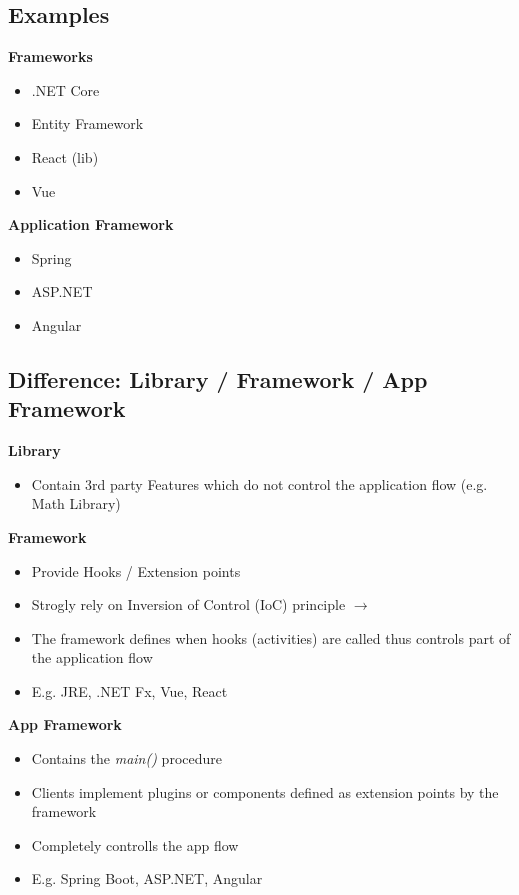 \subsection{Examples}
\textbf{Frameworks}
\begin{itemize}[topsep=0pt]
    \itemsep -0.4em
    \item .NET Core
    \item Entity Framework
    \item React (lib)
    \item Vue
\end{itemize}
\textbf{Application Framework}
\begin{itemize}[topsep=0pt]
    \itemsep -0.4em
    \item Spring
    \item ASP.NET
    \item Angular
\end{itemize}

\subsection{Difference: Library / Framework / App Framework}
\textbf{Library}
\begin{itemize}[topsep=0pt]
    \itemsep -0.4em
    \item Contain 3rd party Features which do not control the application flow (e.g. Math Library)
\end{itemize}
\textbf{Framework}
\begin{itemize}[topsep=0pt]
    \itemsep -0.4em
    \item Provide Hooks / Extension points
    \item Strogly rely on Inversion of Control (IoC) principle $\rightarrow$
    \item The framework defines when hooks (activities) are called thus controls part of the application flow
    \item E.g. JRE, .NET Fx, Vue, React
\end{itemize}
\textbf{App Framework}
\begin{itemize}[topsep=0pt]
    \itemsep -0.4em
    \item Contains the \textit{main()} procedure
    \item Clients implement plugins or components defined as extension points by the framework
    \item Completely controlls the app flow
    \item E.g. Spring Boot, ASP.NET, Angular
\end{itemize}

